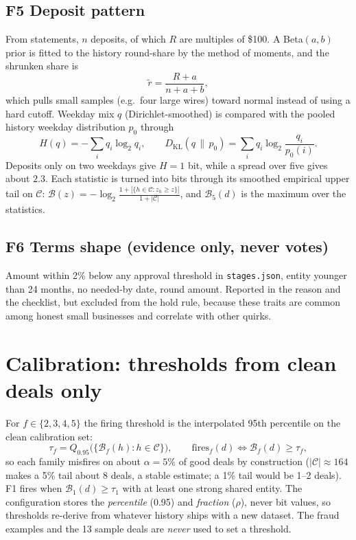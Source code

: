 \documentclass[11pt]{article}
\newcommand{\B}{\mathcal{B}}
\newcommand{\KL}{D_{\mathrm{KL}}}
\begin{document}
\subsection*{F5 \quad Deposit pattern}
From statements, $n$ deposits, of which $R$ are multiples of \$100. A Beta$(a,b)$ prior is fitted to the history round-share by the method of moments, and the shrunken share is
\begin{equation}
\tilde r=\frac{R+a}{n+a+b},
\end{equation}
which pulls small samples (e.g.\ four large wires) toward normal instead of using a hard cutoff.
Weekday mix $q$ (Dirichlet-smoothed) is compared with the pooled history weekday distribution $p_0$ through
\begin{equation}
H(q)=-\sum_{i}q_i\log_2 q_i,\qquad \KL(q\,\|\,p_0)=\sum_i q_i\log_2\frac{q_i}{p_0(i)} .
\end{equation}
Deposits only on two weekdays give $H=1$ bit, while a spread over five gives about $2.3$.
Each statistic is turned into bits through its smoothed empirical upper tail on $\mathcal{C}$: $\B(z)=-\log_2\frac{1+|\{h\in\mathcal{C}: z_h\ge z\}|}{1+|\mathcal{C}|}$, and $\B_5(d)$ is the maximum over the statistics.

\subsection*{F6 \quad Terms shape (evidence only, never votes)}
Amount within 2\% below any approval threshold in \texttt{stages.json}, entity younger than 24 months, no needed-by date, round amount.
Reported in the reason and the checklist, but excluded from the hold rule, because these traits are common among honest small businesses and correlate with other quirks.

\section{Calibration: thresholds from clean deals only}
For $f\in\{2,3,4,5\}$ the firing threshold is the interpolated 95th percentile on the clean calibration set:
\begin{equation}
\tau_f = Q_{0.95}\big(\{\B_f(h): h\in\mathcal{C}\}\big),\qquad \text{fires}_f(d)\iff \B_f(d)\ge\tau_f ,
\end{equation}
so each family misfires on about $\alpha=5\%$ of good deals by construction ($|\mathcal{C}|\approx 164$ makes a 5\% tail about 8 deals, a stable estimate; a 1\% tail would be 1--2 deals).
F1 fires when $\B_1(d)\ge\tau_1$ with at least one strong shared entity.
The configuration stores the \emph{percentile} (0.95) and \emph{fraction} ($\rho$), never bit values, so thresholds re-derive from whatever history ships with a new dataset.
The fraud examples and the 13 sample deals are \emph{never} used to set a threshold.
\end{document}
